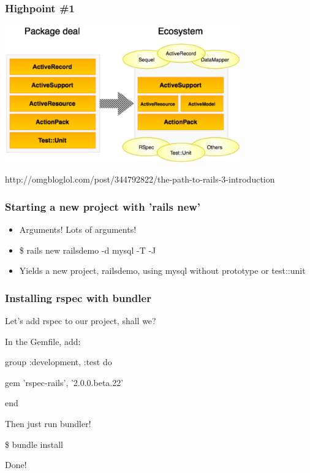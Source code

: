 \documentclass{beamer}
\begin{document}
\begin{frame}
\frametitle{Highpoint \#1}

\includegraphics[width=4in]{omgbloglol_rails3_packaging.png}

http://omgbloglol.com/post/344792822/the-path-to-rails-3-introduction
\end{frame}



\begin{frame}
\frametitle{Starting a new project with 'rails new'}

\begin{itemize}
\item Arguments! Lots of arguments!
\pause
\item \begin{semiverbatim}\$ rails new railsdemo -d mysql -T -J \end{semiverbatim}
\pause

\item Yields a new project, railsdemo, using mysql without prototype or test::unit
\end{itemize}
\end{frame}


\begin{frame}
\frametitle{Installing rspec with bundler}

Let's add rspec to our project, shall we?
\pause

In the Gemfile, add:
\begin{semiverbatim}
group :development, :test do

     gem 'rspec-rails', '2.0.0.beta.22'
     
end
\end{semiverbatim}
\pause
Then just run bundler!

\begin{semiverbatim}
\$ bundle install
\end{semiverbatim}

\pause

Done!
\end{frame}
\end{document}
